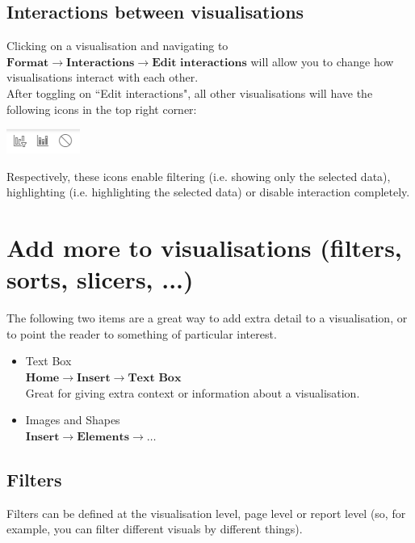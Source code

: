 \documentclass[10pt, openany, twocolumn]{book}
\begin{document}
\subsection*{Interactions between visualisations}
Clicking on a visualisation and navigating to $\textbf{Format} \rightarrow \textbf{Interactions} \rightarrow \textbf{Edit interactions}$ will allow you to change how visualisations interact with each other.\\
After toggling on ``Edit interactions", all other visualisations will have the following icons in the top right corner:
\begin{center}
        \includegraphics[width=0.3\columnwidth]{images/interaction_icons.png}
\end{center}
Respectively, these icons enable filtering (i.e. showing only the selected data), highlighting (i.e. highlighting the selected data) or disable interaction completely.

\section{Add more to visualisations (filters, sorts, slicers, ...)}

The following two items are a great way to add extra detail to a visualisation, or to point the reader to something of particular interest.
\begin{itemize}
    \item Text Box \\
    $\textbf{Home} \rightarrow \textbf{Insert} \rightarrow \textbf{Text Box}$\\ 
    Great for giving extra context or information about a visualisation.
    \item Images and Shapes \\
    $\textbf{Insert} \rightarrow \textbf{Elements} \rightarrow \ldots$
\end{itemize}

\subsection*{Filters}

Filters can be defined at the visualisation level, page level or report level (so, for example, you can filter different visuals by different things). \\
\end{document}
